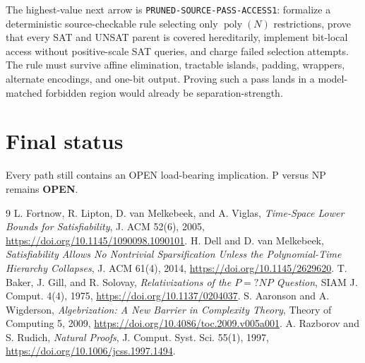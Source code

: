 \documentclass[11pt]{article}
\newcommand{\OPEN}{\textbf{OPEN}}
\begin{document}
The highest-value next arrow is \texttt{PRUNED-SOURCE-PASS-ACCESS1}:
formalize a deterministic source-checkable rule selecting only
$\operatorname{poly}(N)$ restrictions, prove that every SAT and UNSAT parent
is covered hereditarily, implement bit-local access without positive-scale
SAT queries, and charge failed selection attempts.  The rule must survive
affine elimination, tractable islands, padding, wrappers, alternate
encodings, and one-bit output.  Proving such a pass lands in a model-matched
forbidden region would already be separation-strength.

\section*{Final status}
Every path still contains an OPEN load-bearing implication.  P versus NP
remains \OPEN.

\begin{thebibliography}{9}
L. Fortnow, R. Lipton, D. van Melkebeek, and A. Viglas,
\emph{Time-Space Lower Bounds for Satisfiability}, J. ACM 52(6), 2005,
\url{https://doi.org/10.1145/1090098.1090101}.
H. Dell and D. van Melkebeek,
\emph{Satisfiability Allows No Nontrivial Sparsification Unless the
Polynomial-Time Hierarchy Collapses}, J. ACM 61(4), 2014,
\url{https://doi.org/10.1145/2629620}.
T. Baker, J. Gill, and R. Solovay,
\emph{Relativizations of the $P=?NP$ Question}, SIAM J. Comput. 4(4), 1975,
\url{https://doi.org/10.1137/0204037}.
S. Aaronson and A. Wigderson,
\emph{Algebrization: A New Barrier in Complexity Theory}, Theory of
Computing 5, 2009, \url{https://doi.org/10.4086/toc.2009.v005a001}.
A. Razborov and S. Rudich,
\emph{Natural Proofs}, J. Comput. Syst. Sci. 55(1), 1997,
\url{https://doi.org/10.1006/jcss.1997.1494}.
\end{thebibliography}

\end{document}
